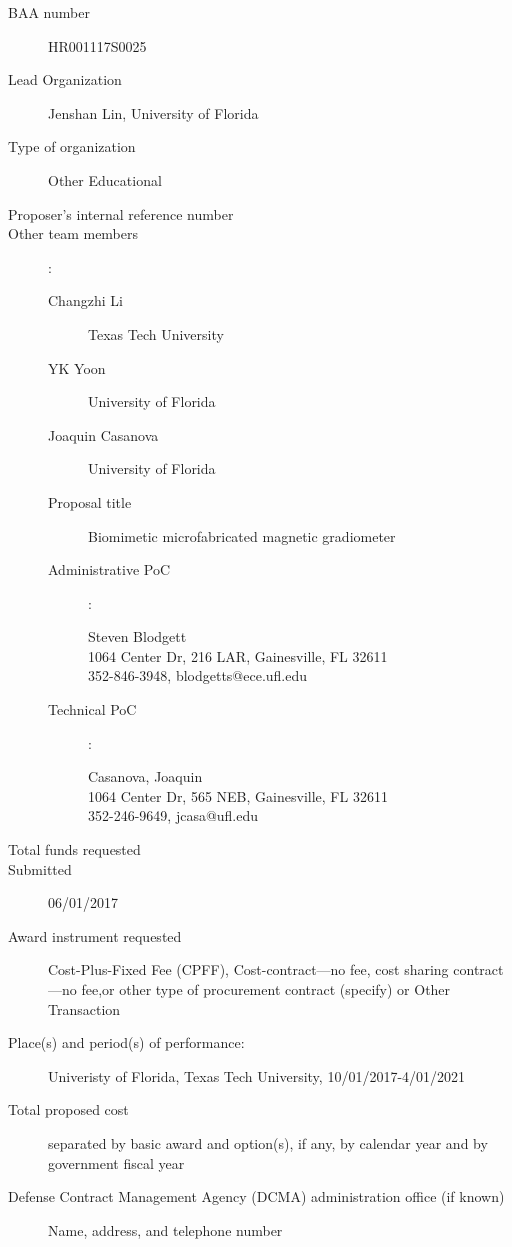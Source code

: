 
\begin{description}
\item [BAA number] HR001117S0025
\item [Lead Organization] Jenshan Lin, University of Florida
\item [Type of organization] Other Educational
\item [Proposer’s internal reference number]
\item [Other team members]:
  \begin{description}
  \item [Changzhi Li] Texas Tech University
  \item [YK Yoon] University of Florida 
  \item [Joaquin Casanova] University of Florida 
  \item [Proposal title] Biomimetic microfabricated magnetic gradiometer
  \item [Administrative PoC]:
    \begin{description}
    \item [Steven Blodgett]
    \item [1064 Center Dr, 216 LAR, Gainesville, FL 32611]
    \item [352-846-3948, blodgetts@ece.ufl.edu]
    \end{description}
  \item [Technical PoC]:
    \begin{description}
    \item [Casanova, Joaquin]
    \item [1064 Center Dr, 565 NEB, Gainesville, FL 32611]
    \item [352-246-9649, jcasa@ufl.edu]
    \end{description}
  \end{description}
\item [Total funds requested]
\item [Submitted] 06/01/2017
\item [Award instrument requested] Cost-Plus-Fixed Fee (CPFF), Cost-contract—no fee, cost sharing contract—no fee,or other type of procurement contract (specify) or Other Transaction
\item [Place(s) and period(s) of performance:] Univeristy of Florida, Texas Tech University, 10/01/2017-4/01/2021
\item [Total proposed cost] separated by basic award and option(s), if any, by calendar year
and by government fiscal year
\item [Defense Contract Management Agency (DCMA) administration office (if known)] Name, address, and telephone number

\end{description}
